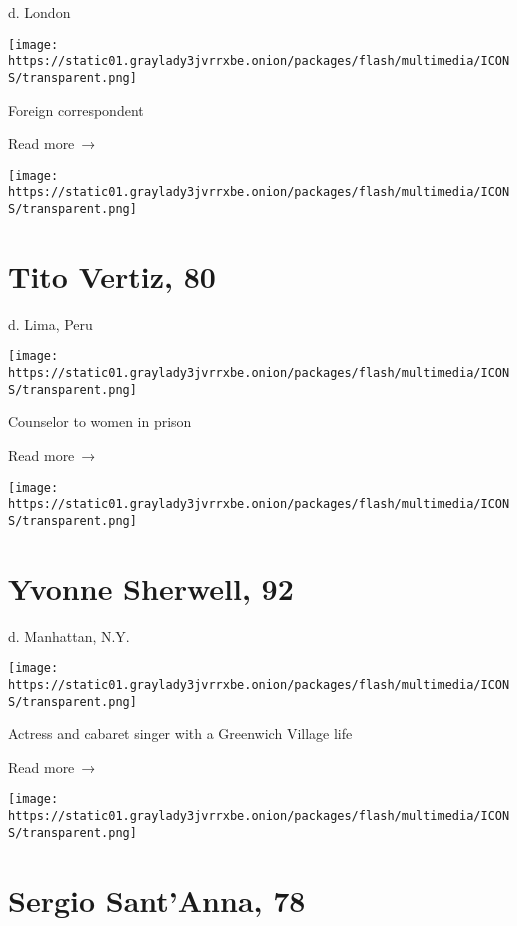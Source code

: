 d. London

\texttt{[image: https://static01.graylady3jvrrxbe.onion/packages/flash/multimedia/ICONS/transparent.png]}

Foreign correspondent

 Read more~→

\href{https://www.nytimes3xbfgragh.onion/2020/07/01/obituaries/tito-vertiz-dead-coronavirus.html}{}

\texttt{[image: https://static01.graylady3jvrrxbe.onion/packages/flash/multimedia/ICONS/transparent.png]}

\hypertarget{tito-vertiz-80}{%
\section{Tito Vertiz, 80}\label{tito-vertiz-80}}

d. Lima, Peru

\texttt{[image: https://static01.graylady3jvrrxbe.onion/packages/flash/multimedia/ICONS/transparent.png]}

Counselor to women in prison

 Read more~→

\href{https://www.nytimes3xbfgragh.onion/2020/06/29/obituaries/yvonne-sherwell-dead-coronavirus.html}{}

\texttt{[image: https://static01.graylady3jvrrxbe.onion/packages/flash/multimedia/ICONS/transparent.png]}

\hypertarget{yvonne-sherwell-92}{%
\section{Yvonne Sherwell, 92}\label{yvonne-sherwell-92}}

d. Manhattan, N.Y.

\texttt{[image: https://static01.graylady3jvrrxbe.onion/packages/flash/multimedia/ICONS/transparent.png]}

Actress and cabaret singer with a Greenwich Village life

 Read more~→

\href{https://www.nytimes3xbfgragh.onion/2020/06/29/obituaries/sergio-santanna-dead-coronavirus.html}{}

\texttt{[image: https://static01.graylady3jvrrxbe.onion/packages/flash/multimedia/ICONS/transparent.png]}

\hypertarget{sergio-santanna-78}{%
\section{Sergio Sant'Anna, 78}\label{sergio-santanna-78}}


